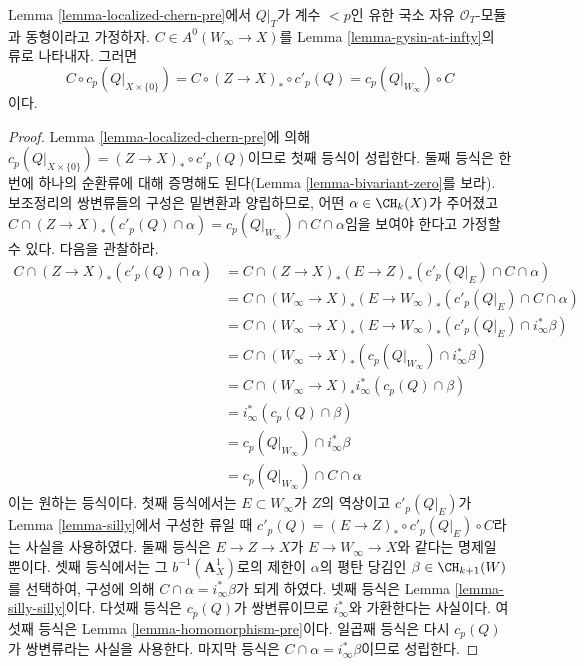 \begin{lemma}
\label{lemma-homomorphism}
Lemma \ref{lemma-localized-chern-pre}에서 $Q|_T$가 계수 $< p$인 유한 국소
자유 $\mathcal{O}_T$-모듈과 동형이라고 가정하자. $C \in A^0(W_\infty \to X)$를
Lemma \ref{lemma-gysin-at-infty}의 류로 나타내자.
그러면
$$
C \circ c_p(Q|_{X \times \{0\}}) =
C \circ (Z \to X)_* \circ c'_p(Q) = c_p(Q|_{W_\infty}) \circ C
$$
이다.
\end{lemma}

\begin{proof}
Lemma \ref{lemma-localized-chern-pre}에 의해
$c_p(Q|_{X \times \{0\}}) =
(Z \to X)_* \circ c'_p(Q)$이므로 첫째
등식이 성립한다. 둘째 등식은 한 번에 하나의 순환류에 대해 증명해도
된다(Lemma \ref{lemma-bivariant-zero}를 보라). 보조정리의 쌍변류들의
구성은 밑변환과 양립하므로, 어떤 $\alpha \in \CH_k(X)$가 주어졌고
$C \cap (Z \to X)_*(c'_p(Q) \cap \alpha) =
c_p(Q|_{W_\infty}) \cap C \cap \alpha$임을 보여야 한다고 가정할 수 있다.
다음을 관찰하라.
\begin{align*}
C \cap (Z \to X)_*(c'_p(Q) \cap \alpha)
& =
C \cap (Z \to X)_* (E \to Z)_*(c'_p(Q|_E) \cap C \cap \alpha) \\
& =
C \cap (W_\infty \to X)_*(E \to W_\infty)_*(c'_p(Q|_E) \cap C \cap \alpha) \\
& =
C \cap (W_\infty \to X)_*(E \to W_\infty)_*(c'_p(Q|_E) \cap i_\infty^*\beta) \\
& =
C \cap (W_\infty \to X)_*(c_p(Q|_{W_\infty}) \cap i_\infty^*\beta) \\
& =
C \cap (W_\infty \to X)_*i_\infty^*(c_p(Q) \cap \beta) \\
& =
i_\infty^*(c_p(Q) \cap \beta) \\
& =
c_p(Q|_{W_\infty}) \cap i_\infty^*\beta \\
& =
c_p(Q|_{W_\infty}) \cap C \cap \alpha
\end{align*}
이는 원하는 등식이다. 첫째 등식에서는 $E \subset W_\infty$가 $Z$의
역상이고 $c'_p(Q|_E)$가 Lemma \ref{lemma-silly}에서 구성한 류일 때
$c'_p(Q) = (E \to Z)_* \circ c'_p(Q|_E) \circ C$라는 사실을 사용하였다.
둘째 등식은 $E \to Z \to X$가 $E \to W_\infty \to X$와 같다는
명제일 뿐이다. 셋째 등식에서는 그 $b^{-1}(\mathbf{A}^1_X)$로의 제한이
$\alpha$의 평탄 당김인 $\beta \in \CH_{k + 1}(W)$를 선택하여, 구성에
의해 $C \cap \alpha = i_\infty^*\beta$가 되게 하였다. 넷째 등식은
Lemma \ref{lemma-silly-silly}이다. 다섯째 등식은 $c_p(Q)$가 쌍변류이므로
$i_\infty^*$와 가환한다는 사실이다. 여섯째 등식은 Lemma
\ref{lemma-homomorphism-pre}이다. 일곱째 등식은 다시 $c_p(Q)$가
쌍변류라는 사실을 사용한다. 마지막 등식은
$C \cap \alpha = i_\infty^*\beta$이므로 성립한다.
\end{proof}

